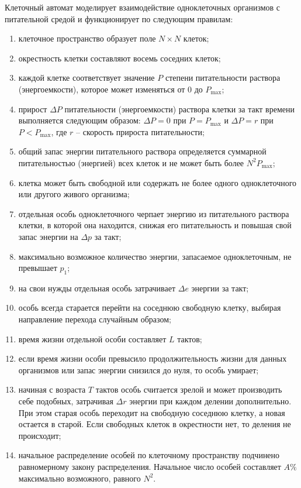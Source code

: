 \documentclass[14pt,a4paper]{extarticle}
\theoremstyle{plain}
\begin{document}
	Клеточный автомат моделирует взаимодействие одноклеточных
	организмов с питательной средой и функционирует по следующим правилам:
	\begin{enumerate}
		\item клеточное пространство образует поле $N \times N$ клеток;
		\item окрестность клетки составляют восемь соседних клеток;
		\item каждой клетке соответствует значение $P$ степени питательности раствора
		(энергоемкости), которое может изменяться от $0$ до $P_{\text{max}}$;
		\item прирост $\Delta P$ питательности (энергоемкости) раствора клетки за такт
		времени выполняется следующим образом: $\Delta P = 0$ при $P = P_{\text{max}}$ и $\Delta P = r$ при
		$P < P_{\text{max}}$, где $r$ – скорость прироста питательности;
		\item общий запас энергии питательного раствора определяется суммарной
		питательностью (энергией) всех клеток и не может быть более $N^2 P_{\text{max}}$;
		\item клетка может быть свободной или содержать не более одного
		одноклеточного или другого живого организма;
		\item отдельная особь одноклеточного черпает энергию из питательного
		раствора клетки, в которой она находится, снижая его питательность и
		повышая свой запас энергии на $\Delta p$ за такт;
		\item максимально возможное количество энергии, запасаемое одноклеточным,
		не превышает $p_1$;
		\item на свои нужды отдельная особь затрачивает $\Delta e$ энергии за такт;
		\item особь всегда старается перейти на соседнюю свободную клетку,
		выбирая направление перехода случайным образом;
		\item время жизни отдельной особи составляет $L$ тактов;
		\item если время жизни особи превысило продолжительность жизни для
		данных организмов или запас энергии снизился до нуля, то особь
		умирает;
		\item начиная с возраста $T$ тактов особь считается зрелой и может
		производить себе подобных, затрачивая $\Delta r$ энергии при каждом делении
		дополнительно. При этом старая особь переходит на свободную
		соседнюю клетку, а новая остается в старой. Если свободных клеток в
		окрестности нет, то деления не происходит;
		\item начальное распределение особей по клеточному пространству
		подчинено равномерному закону распределения. Начальное число особей
		составляет $A\%$ максимально возможного, равного $N^2$.
	\end{enumerate}
	
\end{document}
